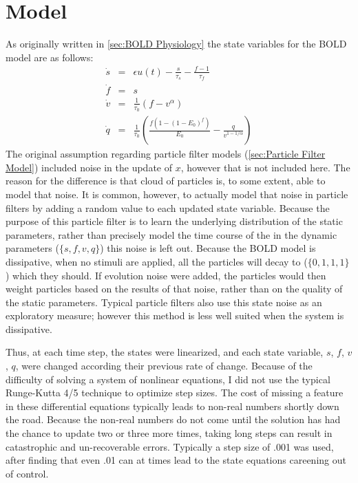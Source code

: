 \section{Model}
As originally written in \autoref{sec:BOLD Physiology} the state variables
for the BOLD model are as follows:
\begin{eqnarray}
\dot{s} &=& \epsilon u(t) - \frac{s}{\tau_s} - \frac{f - 1}{\tau_f} \\
\dot{f} &=& s\\
\dot{v} &=& \frac{1}{\tau_0}(f - v^\alpha)\\
\dot{q} &=& \frac{1}{\tau_0}(\frac{f(1-(1-E_0)^f)}{E_0} - \frac{q}{v^{1-1/\alpha}})
\end{eqnarray}
The original assumption regarding particle filter models (\autoref{sec:Particle Filter Model})
included noise in the update of $x$, however that is not included here.
The reason for the difference is that cloud of particles is, to some extent,
able to model that noise. It is common, however, to actually model that noise
in particle filters by adding a random value to each updated state variable. 
Because the purpose of this particle filter is to learn the underlying distribution
of the static parameters, rather than precisely model the time course of the 
in the dynamic parameters ($\{s,f,v,q\}$) this noise is left out. Because the
BOLD model is dissipative, when no stimuli are applied, all the particles 
will decay to ($\{0,1,1,1\}$) which they should. If evolution noise were added, the 
particles would then weight particles based on the results of that noise, rather
than on the quality of the static parameters. Typical particle filters 
also use this state noise as an exploratory measure; however this method is
less well suited when the system is dissipative. 

Thus, at each time step, the states were linearized, and each state variable,
$s$, $f$, $v$, $q$, were changed according their previous rate of change.
Because of the difficulty of solving a system of nonlinear equations, I 
did not use the typical Runge-Kutta 4/5 technique to optimize step sizes. 
The cost of missing a feature in these differential equations typically leads
to non-real numbers shortly down the road. Because the non-real numbers do 
not come until the solution has had the chance to update two or three more
times, taking long steps can result in catastrophic and un-recoverable errors. 
Typically a step size of .001 was used, after finding that even .01 can
at times lead to the state equations careening out of control.

